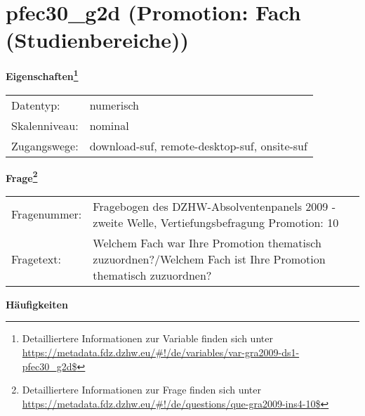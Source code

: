 
    \setcounter{footnote}{0}

    \vspace*{-1.8cm}
	\section{pfec30\_g2d (Promotion: Fach (Studienbereiche))}
	\label{section:pfec30_g2d}



    \vspace*{0.5cm}
    \noindent\textbf{Eigenschaften\footnote{Detailliertere Informationen zur Variable finden sich unter
		\url{https://metadata.fdz.dzhw.eu/\#!/de/variables/var-gra2009-ds1-pfec30_g2d$}}}\\
	\begin{tabularx}{\hsize}{@{}lX}
	Datentyp: & numerisch \\
	Skalenniveau: & nominal \\
	Zugangswege: &
	  download-suf, 
	  remote-desktop-suf, 
	  onsite-suf
 \\
    \end{tabularx}



				\vspace*{0.5cm}
                \noindent\textbf{Frage\footnote{Detailliertere Informationen zur Frage finden sich unter
		              \url{https://metadata.fdz.dzhw.eu/\#!/de/questions/que-gra2009-ins4-10$}}}\\
				\begin{tabularx}{\hsize}{@{}lX}
					Fragenummer: &
					  Fragebogen des DZHW-Absolventenpanels 2009 - zweite Welle, Vertiefungsbefragung Promotion:
					  10
 \\
					Fragetext: & Welchem Fach war Ihre Promotion thematisch zuzuordnen?/Welchem Fach ist Ihre Promotion thematisch zuzuordnen? \\
				\end{tabularx}





        		\vspace*{0.5cm}
                \noindent\textbf{Häufigkeiten}

